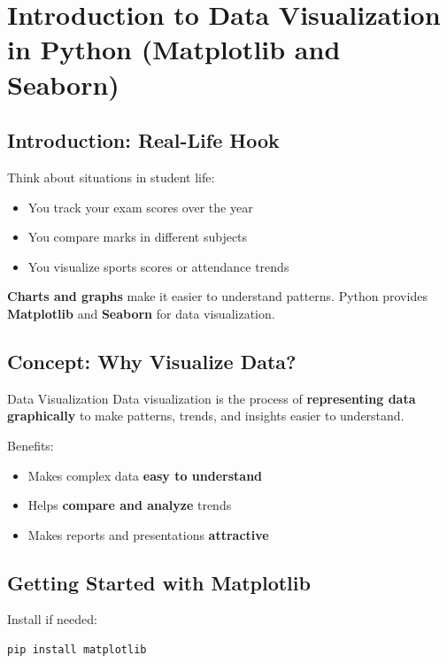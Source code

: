 \chapter{Introduction to Data Visualization in Python (Matplotlib and Seaborn)}

\section{Introduction: Real-Life Hook}

Think about situations in student life:

\begin{itemize}
    \item You track your exam scores over the year  
    \item You compare marks in different subjects  
    \item You visualize sports scores or attendance trends  
\end{itemize}

\textbf{Charts and graphs} make it easier to understand patterns. Python provides \textbf{Matplotlib} and \textbf{Seaborn} for data visualization.

\section{Concept: Why Visualize Data?}

\begin{definition}{Data Visualization}
Data visualization is the process of \textbf{representing data graphically} to make patterns, trends, and insights easier to understand.
\end{definition}

Benefits:

\begin{itemize}
    \item Makes complex data \textbf{easy to understand}  
    \item Helps \textbf{compare and analyze} trends  
    \item Makes reports and presentations \textbf{attractive}  
\end{itemize}

\section{Getting Started with Matplotlib}

Install if needed:

\begin{verbatim}
pip install matplotlib
\end{verbatim}

